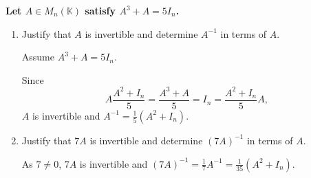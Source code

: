 \providecommand{\rank}{\operatorname{r}}
\providecommand{\RR}{\mathbb R}
\providecommand{\CC}{\mathbb C}
\providecommand{\KK}{\mathbb K}

\setcounter{enumi}{23}
\item {\bfseries\boldmath
Let $A\in M_n(\KK)$ satisfy $A^3+A=5I_n$.
}

\begin{enumerate}[label=\alph*)]

\item Justify that $A$ is invertible and determine $A^{-1}$ in terms of $A$.

\begin{answer}
Assume $A^3+A=5I_n$.

Since
\[
 A\frac{A^2+I_n}{5}=\frac{A^3+A}{5}=I_n
 =\frac{A^2+I_n}{5}A,
\]
$A$ is invertible and $A^{-1}=\frac15(A^2+I_n)$.
\end{answer}

\item Justify that $7A$ is invertible and determine $(7A)^{-1}$ in terms of $A$.

\begin{answer}
As $7\ne0$, $7A$ is invertible and
$(7A)^{-1}=\frac17A^{-1}=\frac1{35}(A^2+I_n)$.
\end{answer}
\end{enumerate}
